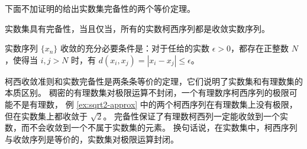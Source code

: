 下面不加证明的给出实数集完备性的两个等价定理。

\begin{theorem}
    实数集具有完备性，当且仅当，所有的实数柯西序列都是收敛实数序列。
\end{theorem}

\begin{theorem}
    实数序列 $\{x_n\}$ 收敛的充分必要条件是：对于任给的实数 $\epsilon>0$，都存在正整数 $N$，使得当 $i,j>N$ 时，有 $d(x_i,x_j) = |x_i - x_j| \le \epsilon$。
\end{theorem}
    

\begin{note}
    柯西收敛准则和实数完备性是两条条等价的定理，它们说明了实数集和有理数集的本质区别。
    稠密的有理数集对极限运算不封闭，一个有理数序柯西序列的极限可能不是有理数，
    例 \ref{ex:sqrt2-approx} 中的两个柯西序列在有理数集上没有极限，但在实数集上都收敛于 $\sqrt{2}$。
    完备性保证了有理数柯西列一定能收敛到一个实数，而不会收敛到一个不属于实数集的元素。
    换句话说，在实数集中，柯西序列与收敛序列是等价的，实数集对极限运算封闭。
\end{note}


